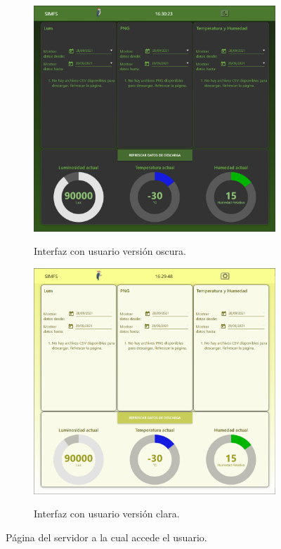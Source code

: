 
\begin{figure}[H]
\centering
	\begin{subfigure}[b]{0.49\textwidth}
		\centering
		\includegraphics[width=\linewidth]{ImagenesIngenieria de Detalle/Node-Red-Dark}
	\label{fig:front_end_dark}
	\caption{Interfaz con usuario versión oscura.}
	\end{subfigure}
	\begin{subfigure}[b]{0.49\textwidth}
		\centering
		\includegraphics[width=\linewidth]{ImagenesIngenieria de Detalle/Node-Red-Light}
	\label{fig:front_end_light}
	\caption{Interfaz con usuario versión clara.}
	\end{subfigure}	
	\caption{Página del servidor a la cual accede el usuario.}
\end{figure}